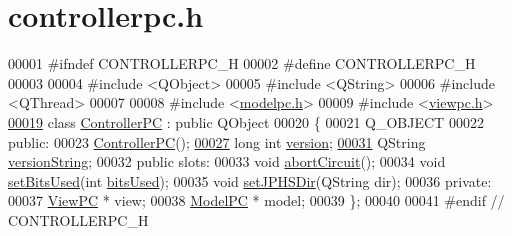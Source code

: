 \hypertarget{controllerpc_8h_source}{}\section{controllerpc.\+h}
\label{controllerpc_8h_source}

\begin{DoxyCode}
00001 \textcolor{preprocessor}{#ifndef CONTROLLERPC\_H}
00002 \textcolor{preprocessor}{#define CONTROLLERPC\_H}
00003 
00004 \textcolor{preprocessor}{#include <QObject>}
00005 \textcolor{preprocessor}{#include <QString>}
00006 \textcolor{preprocessor}{#include <QThread>}
00007 
00008 \textcolor{preprocessor}{#include <\mbox{\hyperlink{modelpc_8h}{modelpc.h}}>}
00009 \textcolor{preprocessor}{#include <\mbox{\hyperlink{viewpc_8h}{viewpc.h}}>}
\mbox{\hyperlink{class_controller_p_c}{00019}} \textcolor{keyword}{class }\mbox{\hyperlink{class_controller_p_c}{ControllerPC}} : \textcolor{keyword}{public} QObject
00020 \{
00021     Q\_OBJECT
00022 \textcolor{keyword}{public}:
00023     \mbox{\hyperlink{class_controller_p_c_afa6c92d67bf3b6531c42385fc5938003}{ControllerPC}}();
\mbox{\hyperlink{class_controller_p_c_a9eb43c34237d66751a6411e55cf5f55e}{00027}}     \textcolor{keywordtype}{long} \textcolor{keywordtype}{int} \mbox{\hyperlink{class_controller_p_c_a9eb43c34237d66751a6411e55cf5f55e}{version}};
\mbox{\hyperlink{class_controller_p_c_a0e63cca37d6ce2e660f3380400c2c5f3}{00031}}     QString \mbox{\hyperlink{class_controller_p_c_a0e63cca37d6ce2e660f3380400c2c5f3}{versionString}};
00032 \textcolor{keyword}{public} slots:
00033     \textcolor{keywordtype}{void} \mbox{\hyperlink{class_controller_p_c_a8814989f7be1214e06b2e720889066b0}{abortCircuit}}();
00034     \textcolor{keywordtype}{void} \mbox{\hyperlink{class_controller_p_c_afd8d33ed84e463c5e0ce6715067003f3}{setBitsUsed}}(\textcolor{keywordtype}{int} \mbox{\hyperlink{namespacetests-setup_a64974eb034f518d24195739395783d3d}{bitsUsed}});
00035     \textcolor{keywordtype}{void} \mbox{\hyperlink{class_controller_p_c_ac00d29685a7e5b780c01eb438e10f96d}{setJPHSDir}}(QString dir);
00036 \textcolor{keyword}{private}:
00037     \mbox{\hyperlink{class_view_p_c}{ViewPC}} * view;
00038     \mbox{\hyperlink{class_model_p_c}{ModelPC}} * model;
00039 \};
00040 
00041 \textcolor{preprocessor}{#endif // CONTROLLERPC\_H}
\end{DoxyCode}
